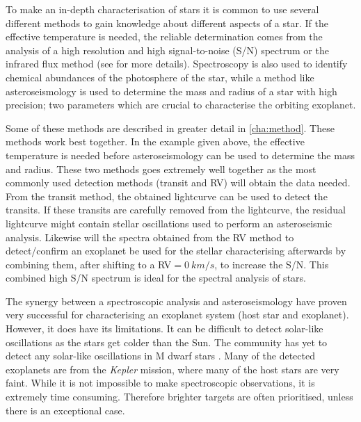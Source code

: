 To make an in-depth characterisation of stars it is common to use several different methods to gain
knowledge about different aspects of a star. If the effective temperature is needed, the reliable
determination comes from the analysis of a high resolution and high signal-to-noise (S/N) spectrum
or the infrared flux method (see  for more details). Spectroscopy is also used to
identify chemical abundances of the photosphere of the star, while a method like asteroseismology is
used to determine the mass and radius of a star with high precision; two parameters which are
crucial to characterise the orbiting exoplanet.

Some of these methods are described in greater detail in \cref{cha:method}. These methods work best
together. In the example given above, the effective temperature is needed before asteroseismology
can be used to determine the mass and radius. These two methods goes extremely well together as the
most commonly used detection methods (transit and RV) will obtain the data needed. From the transit
method, the obtained lightcurve can be used to detect the transits. If these transits are carefully
removed from the lightcurve, the residual lightcurve might contain stellar oscillations used to
perform an asteroseismic analysis. Likewise will the spectra obtained from the RV method to
detect/confirm an exoplanet be used for the stellar characterising afterwards by combining them,
after shifting to a RV$=\SI{0}{km/s}$, to increase the S/N. This combined high S/N spectrum is ideal
for the spectral analysis of stars.

The synergy between a spectroscopic analysis and asteroseismology have proven very successful
\citep[see e.g.][]{Huber2013} for characterising an exoplanet system (host star and exoplanet).
However, it does have its limitations. It can be difficult to detect solar-like oscillations as the
stars get colder than the Sun. The community has yet to detect any solar-like oscillations in M
dwarf stars \citep{Rodriguez2016,Berdinas2017}. Many of the detected exoplanets are from the
\emph{Kepler} mission, where many of the host stars are very faint. While it is not impossible to
make spectroscopic observations, it is extremely time consuming. Therefore brighter targets are
often prioritised, unless there is an exceptional case.

